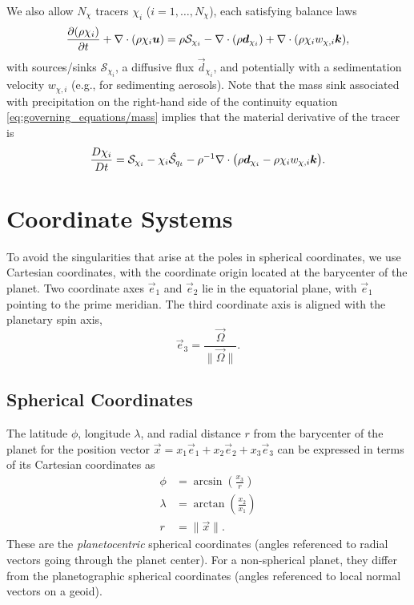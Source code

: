 \documentclass{report}
\begin{document}
We also allow $N_\chi$ tracers $\chi_i$ ($i=1, \dots, N_\chi$), each satisfying balance laws
\begin{equation}
\frac{\partial (\rho \chi_i)}{\partial t} + \nabla \cdot \left(\rho \chi_i \boldsymbol{{u}} \right) = \rho \mathcal{S}_{\chi_i} - \nabla \cdot (\rho \boldsymbol{{d}}_{\chi_i}) + \nabla \cdot (\rho \chi_{i} w_{\chi, i} \boldsymbol{{k}}),   
\label{eq:tracers}
\end{equation}
with sources/sinks $\mathcal{S}_{\chi_i}$, a diffusive flux $\vec{d}_{\chi_i}$, and potentially with a sedimentation velocity $w_{\chi, i}$ (e.g., for sedimenting aerosols). Note that the mass sink associated with precipitation on the right-hand side of the continuity equation \eqref{eq:governing_equations/mass} implies that the material derivative of the tracer is 
\[
\frac{D\chi_i}{Dt} = \mathcal{S}_{\chi_i} - \chi_i \mathcal{\hat S}_{q_t} - \rho^{-1} \nabla \cdot \bigl(\rho \boldsymbol{{d}}_{\chi_i} - \rho \chi_{i} w_{\chi, i} \boldsymbol{{k}}\bigr).
\]
 
\section{Coordinate Systems}

To avoid the singularities that arise at the poles in spherical coordinates, we use Cartesian coordinates, with the coordinate origin located at the barycenter of the planet. Two coordinate axes $\vec{e}_1$ and $\vec{e}_2$ lie in the equatorial plane, with $\vec{e}_1$ pointing to the prime meridian. The third coordinate axis is aligned with the planetary spin axis,
\[
\vec{e}_3 = \frac{\vec{\Omega}}{\|\vec{\Omega}\|}.
\]

\subsection{Spherical Coordinates}

The latitude $\phi$, longitude $\lambda$, and radial distance $r$ from the barycenter of the planet for the position vector $\vec{x} = x_1 \vec{e}_1 + x_2 \vec{e}_2 + x_3 \vec{e}_3$ can be expressed in terms of its Cartesian coordinates as
\begin{subequations}
\begin{align}
\phi     &= \arcsin\left(\frac{x_3}{r}\right) \\
\lambda  &= \arctan\left(\frac{x_2}{x_1}\right) \\
r        &= \|\vec{x}\|.
\end{align}
\end{subequations}
These are the \emph{planetocentric} spherical coordinates (angles referenced to radial vectors going through the planet center). For a non-spherical planet, they differ from the planetographic spherical coordinates (angles referenced to local normal vectors on a geoid).
\end{document}
